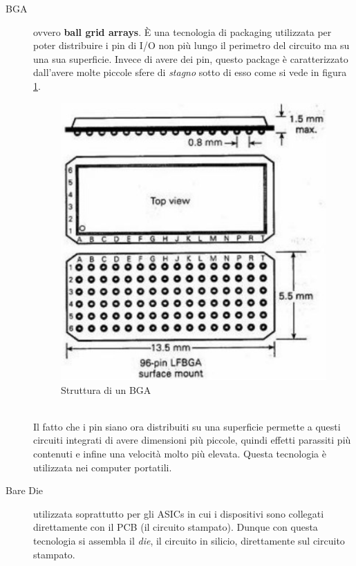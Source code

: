 \documentclass[12pt, a4paper]{report}
\begin{document}
\begin{description}
    \item[BGA] ovvero \textbf{ball grid arrays}. È una tecnologia di packaging utilizzata per poter distribuire i pin di I/O non più lungo il perimetro del circuito ma su una sua superficie. Invece di avere dei pin, questo package è caratterizzato dall'avere molte piccole sfere di \textit{stagno} sotto di esso come si vede in figura \ref{bga}.
    \begin{figure}[h]
        \centering
        \includegraphics[scale=0.38,angle=0]{bga.png}
        \caption{Struttura di un BGA}
        \label{bga}
    \end{figure}
    \\Il fatto che i pin siano ora distribuiti su una superficie permette a questi circuiti integrati di avere dimensioni più piccole, quindi effetti parassiti più contenuti e infine una velocità molto più elevata. Questa tecnologia è utilizzata nei computer portatili.
    \item[Bare Die] utilizzata soprattutto per gli ASICs in cui i dispositivi sono collegati direttamente con il PCB (il circuito stampato). Dunque con questa tecnologia si assembla il \textit{die}, il circuito in silicio, direttamente sul circuito stampato.
    \begin{figure}[hb]
        \centering

\end{figure}
\end{description}
\end{document}
